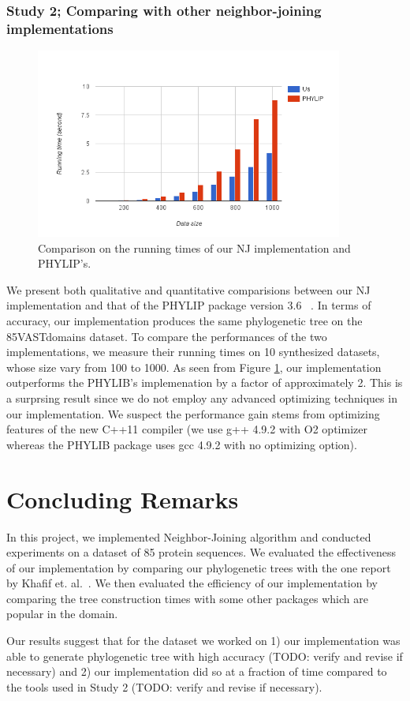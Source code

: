 \documentclass[11pt,letterpaper]{article}
\theoremstyle{definition}
\begin{document}
\subsubsection{Study 2; Comparing with other neighbor-joining implementations}

\begin{figure}[t]
  \centering
  \includegraphics[width=0.9\textwidth]{runningtime.png}
  \caption{Comparison on the running times of our NJ implementation and PHYLIP's.}
  \label{fig:runningtime}
\end{figure}


We present both qualitative and quantitative comparisions between our NJ implementation and that of the PHYLIP package version 3.6 ~\cite{felsenstein2005phylip}. In terms of accuracy, our implementation produces the same phylogenetic tree on the 85VASTdomains dataset. To compare the performances of the two implementations, we measure their running times on 10 synthesized datasets, whose size vary from 100 to 1000. As seen from Figure \ref{fig:runningtime}, our implementation outperforms the PHYLIB's implemenation by a factor of approximately 2. This is a surprsing result since we do not employ any advanced optimizing techniques in our implementation. We suspect the performance gain stems from optimizing features of the new C++11 compiler (we use g++ 4.9.2 with O2 optimizer whereas the PHYLIB package uses gcc 4.9.2 with no optimizing option).  

\section{Concluding Remarks}

In this project, we implemented Neighbor-Joining algorithm and conducted experiments on a dataset of 85 protein sequences. We evaluated the effectiveness of our implementation by comparing our phylogenetic trees with the one report by Khafif et. al.~\cite{khafif2014identification}. We then evaluated the efficiency of our implementation by comparing the tree construction times with some other packages which are popular in the domain.

Our results suggest that for the dataset we worked on 1) our implementation was able to generate phylogenetic tree with high accuracy (TODO: verify and revise if necessary) and 2) our implementation did so at a fraction of time compared to the tools used in Study 2 (TODO: verify and revise if necessary).



\end{document}
